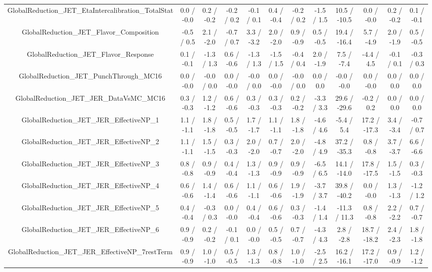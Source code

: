 \begin{table}[htbp]
\begin{center}
\begin{tabular}{|c|c|c|c|c|c|c|c|c|c|c|c|}
  GlobalReduction_JET_EtaIntercalibration_TotalStat & 0.0 / -0.0 & 0.2 / -0.2 & -0.2 / 0.2 & -0.1 / 0.1 & 0.4 / -0.4 & -0.2 / 0.2 & -1.5 / 1.5 & 10.5 / -10.5 & 0.0 / -0.0 & 0.2 / -0.2 & 0.1 / -0.1 \\ 
  GlobalReduction_JET_Flavor_Composition & -0.5 / 0.5 & 2.1 / -2.0 & -0.7 / 0.7 & 3.3 / -3.2 & 2.0 / -2.0 & 0.9 / -0.9 & 0.5 / -0.5 & 19.4 / -16.4 & 5.7 / -4.9 & 2.0 / -1.9 & 0.5 / -0.5 \\ 
  GlobalReduction_JET_Flavor_Response & 0.1 / -0.1 & -1.3 / 1.3 & 0.6 / -0.6 & -1.3 / 1.3 & -1.5 / 1.5 & -0.4 / 0.4 & 2.0 / -1.9 & 7.5 / -7.4 & -4.4 / 4.5 & -0.1 / 0.1 & -0.3 / 0.3 \\ 
  GlobalReduction_JET_PunchThrough_MC16 & 0.0 / -0.0 & -0.0 / 0.0 & 0.0 / -0.0 & -0.0 / 0.0 & 0.0 / -0.0 & -0.0 / 0.0 & 0.0 / 0.0 & -0.0 / -0.0 & 0.0 / -0.0 & 0.0 / 0.0 & 0.0 / 0.0 \\ 
  GlobalReduction_JET_JER_DataVsMC_MC16 & 0.3 / -0.3 & 1.2 / -1.2 & 0.6 / -0.6 & 0.3 / -0.3 & 0.3 / -0.3 & 0.2 / -0.2 & -3.3 / 3.3 & 29.6 / -29.6 & -0.2 / 0.2 & 0.0 / 0.0 & 0.0 / 0.0 \\ 
  GlobalReduction_JET_JER_EffectiveNP_1 & 1.1 / -1.1 & 1.8 / -1.8 & 0.5 / -0.5 & 1.7 / -1.7 & 1.1 / -1.1 & 1.8 / -1.8 & -4.6 / 4.6 & -5.4 / 5.4 & 17.2 / -17.3 & 3.4 / -3.4 & -0.7 / 0.7 \\ 
  GlobalReduction_JET_JER_EffectiveNP_2 & 1.1 / -1.1 & 1.5 / -1.5 & 0.3 / -0.3 & 2.0 / -2.0 & 0.7 / -0.7 & 2.0 / -2.0 & -4.8 / 4.9 & 37.2 / -35.3 & 0.8 / -0.8 & 3.7 / -3.7 & 6.6 / -6.6 \\ 
  GlobalReduction_JET_JER_EffectiveNP_3 & 0.8 / -0.8 & 0.9 / -0.9 & 0.4 / -0.4 & 1.3 / -1.3 & 0.9 / -0.9 & 0.9 / -0.9 & -6.5 / 6.5 & 14.1 / -14.0 & 17.8 / -17.5 & 1.5 / -1.5 & 0.3 / -0.3 \\ 
  GlobalReduction_JET_JER_EffectiveNP_4 & 0.6 / -0.6 & 1.4 / -1.4 & 0.6 / -0.6 & 1.1 / -1.1 & 0.6 / -0.6 & 1.9 / -1.9 & -3.7 / 3.7 & 39.8 / -40.2 & 0.0 / -0.0 & 1.3 / -1.3 & -1.2 / 1.2 \\ 
  GlobalReduction_JET_JER_EffectiveNP_5 & 0.4 / -0.4 & -0.3 / 0.3 & 0.0 / -0.0 & 0.4 / -0.4 & 0.6 / -0.6 & 0.3 / -0.3 & -1.4 / 1.4 & -11.3 / 11.3 & 0.8 / -0.8 & 2.2 / -2.2 & 0.7 / -0.7 \\ 
  GlobalReduction_JET_JER_EffectiveNP_6 & 0.9 / -0.9 & 0.2 / -0.2 & -0.1 / 0.1 & 0.0 / -0.0 & 0.5 / -0.5 & 0.7 / -0.7 & -4.3 / 4.3 & 2.8 / -2.8 & 18.7 / -18.2 & 2.4 / -2.3 & 1.8 / -1.8 \\ 
  GlobalReduction_JET_JER_EffectiveNP_7restTerm & 0.9 / -0.9 & 1.0 / -1.0 & 0.5 / -0.5 & 1.3 / -1.3 & 0.8 / -0.8 & 1.0 / -1.0 & -2.5 / 2.5 & 16.2 / -16.1 & 17.2 / -17.0 & 0.9 / -0.9 & 1.2 / -1.2 \\ 

\end{tabular}
\end{center}
\end{table}
